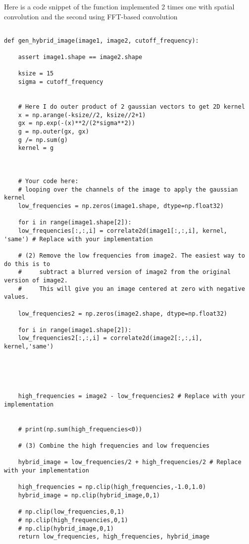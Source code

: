 Here is a code snippet of the function implemented 2 times one with spatial convolution and the second using FFT-based convolution


\begin{lstlisting}

def gen_hybrid_image(image1, image2, cutoff_frequency):
	
	assert image1.shape == image2.shape
	
	ksize = 15
	sigma = cutoff_frequency
	
	
	# Here I do outer product of 2 gaussian vectors to get 2D kernel
	x = np.arange(-ksize//2, ksize//2+1)
	gx = np.exp(-(x)**2/(2*sigma**2))
	g = np.outer(gx, gx)
	g /= np.sum(g)
	kernel = g
	
	
	
	# Your code here:
	# looping over the channels of the image to apply the gaussian kernel
	low_frequencies = np.zeros(image1.shape, dtype=np.float32)
	
	for i in range(image1.shape[2]):
	low_frequencies[:,:,i] = correlate2d(image1[:,:,i], kernel, 'same') # Replace with your implementation
	
	# (2) Remove the low frequencies from image2. The easiest way to do this is to
	#     subtract a blurred version of image2 from the original version of image2.
	#     This will give you an image centered at zero with negative values.
	
	low_frequencies2 = np.zeros(image2.shape, dtype=np.float32)
	
	for i in range(image1.shape[2]):
	low_frequencies2[:,:,i] = correlate2d(image2[:,:,i], kernel,'same')
	
	
	
	
	
	high_frequencies = image2 - low_frequencies2 # Replace with your implementation
	
	
	# print(np.sum(high_frequencies<0))
	
	# (3) Combine the high frequencies and low frequencies
	
	hybrid_image = low_frequencies/2 + high_frequencies/2 # Replace with your implementation
	
	high_frequencies = np.clip(high_frequencies,-1.0,1.0)
	hybrid_image = np.clip(hybrid_image,0,1)

	# np.clip(low_frequencies,0,1)
	# np.clip(high_frequencies,0,1)
	# np.clip(hybrid_image,0,1)
	return low_frequencies, high_frequencies, hybrid_image


\end{lstlisting}

